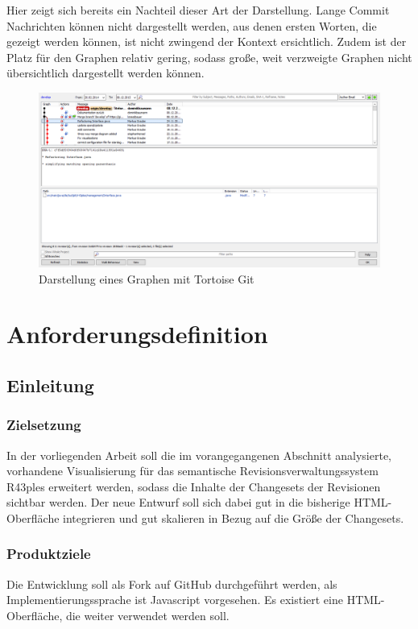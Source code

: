 \documentclass[nocolor]{tudbook}
\begin{document}
Hier zeigt sich bereits ein Nachteil dieser Art der Darstellung. Lange Commit Nachrichten können nicht dargestellt werden, aus denen ersten Worten, die gezeigt werden können, ist nicht zwingend der Kontext ersichtlich. Zudem ist der Platz für den Graphen relativ gering, sodass große, weit verzweigte Graphen nicht übersichtlich dargestellt werden können.

\begin{figure}[htb]
	\centering
	\includegraphics[width=\textwidth]{TortoiseGit.png}
	\caption{Darstellung eines Graphen mit Tortoise Git}
	\label{fig:TortoiseGit}
\end{figure}

\chapter{Anforderungsdefinition}
\section{Einleitung}
\subsection{Zielsetzung}
In der vorliegenden Arbeit soll die im vorangegangenen Abschnitt analysierte, vorhandene Visualisierung für das semantische Revisionsverwaltungssystem R43ples erweitert werden, sodass die Inhalte der Changesets der Revisionen sichtbar werden. Der neue Entwurf soll sich dabei gut in die bisherige HTML-Oberfläche integrieren und gut skalieren in Bezug auf die Größe der Changesets.

\subsection{Produktziele}
Die Entwicklung soll als Fork auf GitHub durchgeführt werden, als Implementierungssprache ist Javascript vorgesehen. Es existiert eine HTML-Oberfläche, die weiter verwendet werden soll.
\end{document}
